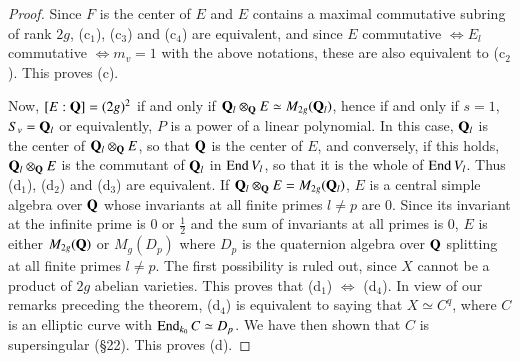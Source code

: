\begin{proof}
Since $F$ is the center of $E$ and $E$ contains a maximal commutative subring of rank $2g$, (c$_1$), (c$_3$) and (c$_4$) are equivalent, and since $E$ commutative $\Leftrightarrow E_l$ commutative $\Leftrightarrow m_v =1$ with the above notations, these are also equivalent to (c$_2$). This proves (c).

Now, $[E:\mathbf{Q}] = (2g)^2$ if and only if $\mathbf{Q}_l \otimes_{\mathbf{Q}} E \simeq M_{2g} (\mathbf{Q}_l)$, hence if and only if $s =1$, $S_v = \mathbf{Q}_l$ or equivalently, $P$ is a power of a linear polynomial. In this case, $\mathbf{Q}_l$  is the center of $\mathbf{Q}_l \otimes_{\mathbf{Q}} E$, so that $\mathbf{Q}$ is the center of $E$, and conversely, if this holds, $\mathbf{Q}_l \otimes_{\mathbf{Q}} E$ is the commutant of $\mathbf{Q}_l$ in $\operatorname{End} V_l$, so that it is the whole of $\operatorname{End} V_l$. Thus (d$_1$), (d$_2$) and (d$_3$) are equivalent. If $\mathbf{Q}_l \otimes_{\mathbf{Q}} E = M_{2g} (\mathbf{Q}_l)$, $E$ is a central simple algebra over $\mathbf{Q}$ whose invariants at all finite primes  $l\neq p$ are 0. Since its invariant at the infinite prime is 0 or $\frac{1}{2}$ and the sum of invariants at all primes is 0, $E$ is either $M_{2g} (\mathbf{Q})$ or $M_g (D_p)$ where $D_p$ is the quaternion algebra over $\mathbf{Q}$ splitting at all finite primes $l\neq p$. The first possibility is ruled out, since $X$ cannot be a product of $2g$ abelian varieties. This proves that (d$_1$) $\iff$ (d$_4$). In view of our remarks preceding the theorem, (d$_4$) is equivalent to saying that $X \simeq C^q$, where $C$ is an elliptic curve with $\operatorname{End}_{k_0} C \simeq D_p$. We have then shown that $C$ is supersingular (\S 22). This proves (d).


\end{proof}
